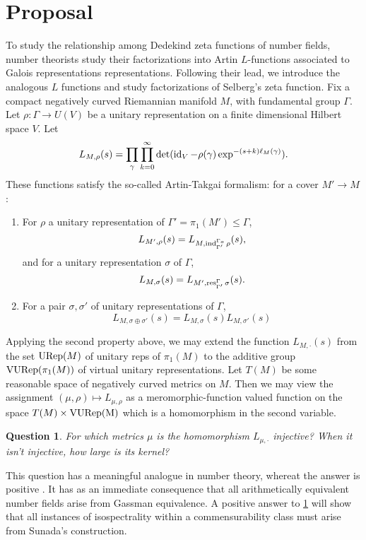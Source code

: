 \documentclass[12pt]{article}
\newtheorem{question}{Question}
\begin{document}
\section{Proposal}
To study the relationship among Dedekind zeta functions of number fields, number theorists study their factorizations into Artin $L$-functions associated to Galois representations representations. Following their lead, we introduce the analogous $L$ functions and study factorizations of Selberg's zeta function. Fix a compact negatively curved Riemannian manifold $M$, with fundamental group $\Gamma$. Let $\rho: \Gamma \to U(V)$ be a unitary representation on a finite dimensional Hilbert space $V$. Let
\[	L_{M,\rho}(s) = \prod_{\gamma} \prod_{k=0}^\infty   \det ( \operatorname{id}_V -  \rho(\gamma)\exp^{-(s+k) \ell_M(\gamma) }  ) .\label{slf}\]
These functions satisfy the so-called Artin-Takgai formalism: for a cover $M' \to M$ :
\begin{enumerate}
	
	\item  For $\rho$ a unitary representation of $\Gamma' = \pi_1( M' ) \leq \Gamma$, 
	\[ L_{M',\rho} (s)  = L_{M, \operatorname{ind}_{\Gamma'}^{\Gamma_o} \rho} (s),
	 \]  
	 and for a unitary representation $\sigma$ of $\Gamma$,
	\[ L_{M,\sigma} (s)  = L_{M',\operatorname{res}_{\Gamma'}^{\Gamma}\sigma} (s). \]
	\item For a pair $\sigma, \sigma'$ of unitary representations of $\Gamma$, 
	\[ L_{M,\sigma \oplus \sigma' }(s) = L_{M,\sigma}(s) L_{M,\sigma'}(s) \]
\end{enumerate}
Applying the second property above, we may extend the function $L_{M,\cdot} (s)$ from the set ${\rm URep}(M)$ of unitary reps of $\pi_1(M)$ to the additive group ${\rm VURep}(\pi_1(M))$ of virtual unitary representations. Let $T(M)$ be some reasonable space of negatively curved metrics on $M$. Then we may view the assignment $(\mu,\rho) \mapsto L_{\mu,\rho}$ as a meromorphic-function valued function on the space $T(M) \times {\rm VURep(M)}$ which is a homomorphism in the second variable. 

\begin{question}\label{q:multind}
	For which metrics $\mu$ is the homomorphism $L_{\mu, \cdot}$ injective? When it isn't injective, how large is its kernel? 
\end{question} 

This question has a meaningful analogue in number theory, whereat the answer is positive \cite{funakura1978}. It has as an immediate consequence that all arithmetically equivalent number fields arise from Gassman equivalence\cite{perlis1977}. A positive answer to \cref{q:multind} will show that all instances of isospectrality within a commensurability class must arise from Sunada's construction. 
 
\end{document}
